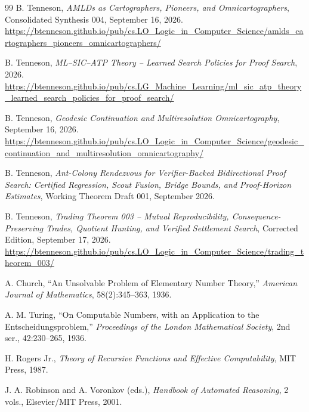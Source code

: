 \documentclass[11pt]{article}
\theoremstyle{definition}
\begin{document}
\begin{thebibliography}{99}
B. Tenneson, \emph{AMLDs as Cartographers, Pioneers, and Omnicartographers}, Consolidated Synthesis 004, September 16, 2026.\\
\url{https://btenneson.github.io/pub/cs.LO_Logic_in_Computer_Science/amlds_cartographers_pioneers_omnicartographers/}

B. Tenneson, \emph{ML--SIC--ATP Theory -- Learned Search Policies for Proof Search}, 2026.\\
\url{https://btenneson.github.io/pub/cs.LG_Machine_Learning/ml_sic_atp_theory_learned_search_policies_for_proof_search/}

B. Tenneson, \emph{Geodesic Continuation and Multiresolution Omnicartography}, September 16, 2026.\\
\url{https://btenneson.github.io/pub/cs.LO_Logic_in_Computer_Science/geodesic_continuation_and_multiresolution_omnicartography/}

B. Tenneson, \emph{Ant-Colony Rendezvous for Verifier-Backed Bidirectional Proof Search: Certified Regression, Scout Fusion, Bridge Bounds, and Proof-Horizon Estimates}, Working Theorem Draft 001, September 2026.

B. Tenneson, \emph{Trading Theorem 003 -- Mutual Reproducibility, Consequence-Preserving Trades, Quotient Hunting, and Verified Settlement Search}, Corrected Edition, September 17, 2026.\\
\url{https://btenneson.github.io/pub/cs.LO_Logic_in_Computer_Science/trading_theorem_003/}

A. Church, ``An Unsolvable Problem of Elementary Number Theory,'' \emph{American Journal of Mathematics}, 58(2):345--363, 1936.

A. M. Turing, ``On Computable Numbers, with an Application to the Entscheidungsproblem,'' \emph{Proceedings of the London Mathematical Society}, 2nd ser., 42:230--265, 1936.

H. Rogers Jr., \emph{Theory of Recursive Functions and Effective Computability}, MIT Press, 1987.

J. A. Robinson and A. Voronkov (eds.), \emph{Handbook of Automated Reasoning}, 2 vols., Elsevier/MIT Press, 2001.
\end{thebibliography}
\end{document}
